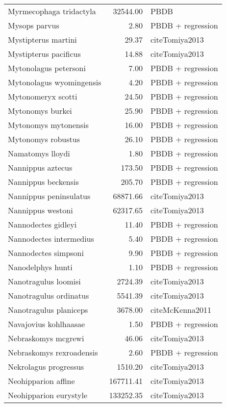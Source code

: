 \begin{table}[ht]
\begin{tabular}{lrl}
  Myrmecophaga tridactyla & 32544.00 & PBDB \\ 
  Mysops parvus & 2.80 & PBDB + regression \\ 
  Mystipterus martini & 29.37 & cite{Tomiya2013} \\ 
  Mystipterus pacificus & 14.88 & cite{Tomiya2013} \\ 
  Mytonolagus petersoni & 7.00 & PBDB + regression \\ 
  Mytonolagus wyomingensis & 4.20 & PBDB + regression \\ 
  Mytonomeryx scotti & 24.50 & PBDB + regression \\ 
  Mytonomys burkei & 25.90 & PBDB + regression \\ 
  Mytonomys mytonensis & 16.00 & PBDB + regression \\ 
  Mytonomys robustus & 26.10 & PBDB + regression \\ 
  Namatomys lloydi & 1.80 & PBDB + regression \\ 
  Nannippus aztecus & 173.50 & PBDB + regression \\ 
  Nannippus beckensis & 205.70 & PBDB + regression \\ 
  Nannippus peninsulatus & 68871.66 & cite{Tomiya2013} \\ 
  Nannippus westoni & 62317.65 & cite{Tomiya2013} \\ 
  Nannodectes gidleyi & 11.40 & PBDB + regression \\ 
  Nannodectes intermedius & 5.40 & PBDB + regression \\ 
  Nannodectes simpsoni & 9.90 & PBDB + regression \\ 
  Nanodelphys hunti & 1.10 & PBDB + regression \\ 
  Nanotragulus loomisi & 2724.39 & cite{Tomiya2013} \\ 
  Nanotragulus ordinatus & 5541.39 & cite{Tomiya2013} \\ 
  Nanotragulus planiceps & 3678.00 & cite{McKenna2011} \\ 
  Navajovius kohlhaasae & 1.50 & PBDB + regression \\ 
  Nebraskomys mcgrewi & 46.06 & cite{Tomiya2013} \\ 
  Nebraskomys rexroadensis & 2.60 & PBDB + regression \\ 
  Nekrolagus progressus & 1510.20 & cite{Tomiya2013} \\ 
  Neohipparion affine & 167711.41 & cite{Tomiya2013} \\ 
  Neohipparion eurystyle & 133252.35 & cite{Tomiya2013} \\ 

\end{tabular}
\end{table}
